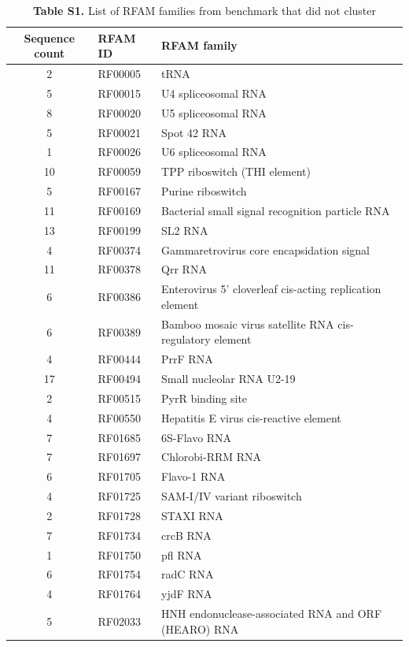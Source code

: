 \documentclass{bmcart}
\begin{document}
\begin{table}
\centering
\caption*{\textbf{Table S1.}  List of RFAM families from benchmark that did not cluster}
\begin{tabular}{cll}
\hline
Sequence count & RFAM ID & RFAM family \\
\hline
2 & RF00005 &  tRNA \\
5 & RF00015 &  U4 spliceosomal RNA \\
8 & RF00020 &  U5 spliceosomal RNA \\
5 & RF00021 &  Spot 42 RNA \\
1 & RF00026 &  U6 spliceosomal RNA \\
10 & RF00059 &  TPP riboswitch (THI element) \\
5 & RF00167 &  Purine riboswitch \\
11 & RF00169 &  Bacterial small signal recognition particle RNA \\
13 & RF00199 &  SL2 RNA \\
4 & RF00374 &  Gammaretrovirus core encapsidation signal \\
11 & RF00378 &  Qrr RNA \\
6 & RF00386 &  Enterovirus 5' cloverleaf cis-acting replication element \\
6 & RF00389 &  Bamboo mosaic virus satellite RNA cis-regulatory element \\
4 & RF00444 &  PrrF RNA \\
17 & RF00494 &  Small nucleolar RNA U2-19 \\
2 & RF00515 &  PyrR binding site \\
4 & RF00550 &  Hepatitis E virus cis-reactive element \\
7 & RF01685 &  6S-Flavo RNA \\
7 & RF01697 &  Chlorobi-RRM RNA \\
6 & RF01705 &  Flavo-1 RNA \\
4 & RF01725 &  SAM-I/IV variant riboswitch \\
2 & RF01728 &  STAXI RNA \\
7 & RF01734 &  crcB RNA \\
1 & RF01750 &  pfl RNA \\
6 & RF01754 &  radC RNA \\
4 & RF01764 &  yjdF RNA \\
5 & RF02033 &  HNH endonuclease-associated RNA and ORF (HEARO) RNA \\
\hline
\end{tabular}
\end{table}
\end{document}
